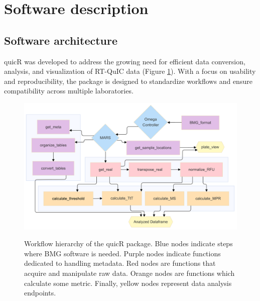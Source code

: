 \documentclass[preprint,12pt, a4paper]{elsarticle}
\begin{document}
% 

\section{Software description}
    \subsection{Software architecture}
        quicR was developed to address the growing need for efficient data conversion, analysis, and visualization of RT-QuIC data (Figure \ref{fig:workflow}). With a focus on usability and reproducibility, the package is designed to standardize workflows and ensure compatibility across multiple laboratories. 
        \begin{figure}[ht]
            \caption{Workflow hierarchy of the quicR package. Blue nodes indicate steps where BMG software is needed. Purple nodes indicate functions dedicated to handling metadata. Red nodes are functions that acquire and manipulate raw data. Orange nodes are functions which calculate some metric. Finally, yellow nodes represent data analysis endpoints.}
            \centering
            \includegraphics[width=\textwidth]{images/workflow2.png}
            \label{fig:workflow}
        \end{figure}
\end{document}
